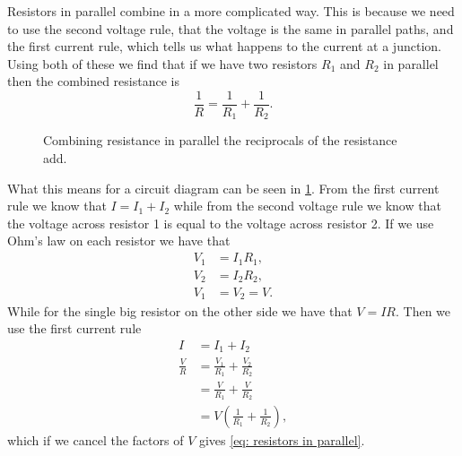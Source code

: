 Resistors in parallel combine in a more complicated way. This is because we need to use the second voltage rule, that the voltage is the same in parallel paths, and the first current rule, which tells us what happens to the current at a junction. Using both of these we find that if we have two resistors $R_{1}$ and $R_{2}$ in parallel then the combined resistance is
\begin{equation}
\frac{1}{R}=\frac{1}{R_{1}}+\frac{1}{R_{2}}.
\label{eq: resistors in parallel}
\end{equation}

  \begin{figure}[ht]
    \centering
    \caption{Combining resistance in parallel the reciprocals of the resistance add.}
    \label{fig: resistors in parallel}
\end{figure}

What this means for a circuit diagram can be seen in \cref{fig: resistors in parallel}.  From the first current rule we know that $I=I_{1}+I_{2}$ while from the second voltage rule we know that the voltage across resistor 1 is equal to the voltage across resistor 2. If we use Ohm's law on each resistor we have that 
\begin{align*}
V_{1}&=I_{1} R_{1},\\
V_{2}&=I_{2} R_{2},\\
V_{1}&=V_{2}=V.
\end{align*}
While for the single big resistor on the other side we have that $V=IR$.  Then we use the first current rule 
\begin{align*}
I&=I_{1}+I_{2}\\
\frac{V}{R}&=\frac{V_{1}}{R_{1}}+\frac{V_{2}}{R_{2}}\\
&=\frac{V}{R_{1}}+\frac{V}{R_{2}}\\
&=V\left(\frac{1}{R_{1}}+\frac{1}{R_{2}}\right),
\end{align*}
which if we cancel the factors of $V$ gives \cref{eq: resistors in parallel}.

